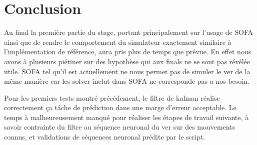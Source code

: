 \chapter{Conclusion} %
\label{cha:Conclusion}

Au final la première partie du stage, portant principalement sur l'usage de
SOFA ainsi que de rendre le comportement du simulateur exactement similaire à
l'implémentation de référence, aura pris plus de temps que prévue. En effet
nous avons à plusieurs piétiner sur des hypothèse qui aux finals ne se sont pas
révélée utile. SOFA tel qu'il est actuellement ne nous permet pas de simuler
le ver de la même manière car les solver inclut dans SOFA ne corresponde pas
a nos besoin. 

Pour les premiers tests montré précédement, le filtre de kalman réalise correctement
ça tâche de prédiction dans une marge d'erreur acceptable. Le temps à malheureusement
manqué pour réaliser les étapes de travail suivante, à savoir contrainte du filtre au
séquence neuronal du ver sur des mouvements connus, et validations de séquences
neuronal prédite par le script.

